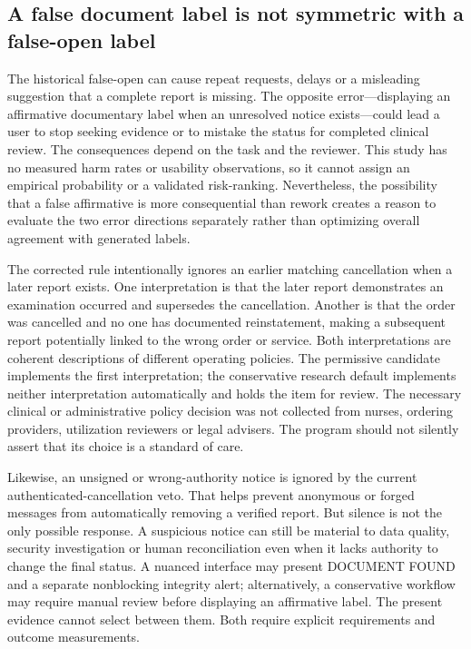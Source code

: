 \documentclass[11pt,twocolumn]{article}
\newcommand{\stage}[1]{\textsf{#1}}
\begin{document}
\subsection{A false document label is not symmetric with a false-open label}
The historical false-open can cause repeat requests, delays or a misleading suggestion that a complete report is missing. The opposite error---displaying an affirmative documentary label when an unresolved notice exists---could lead a user to stop seeking evidence or to mistake the status for completed clinical review. The consequences depend on the task and the reviewer. This study has no measured harm rates or usability observations, so it cannot assign an empirical probability or a validated risk-ranking. Nevertheless, the possibility that a false affirmative is more consequential than rework creates a reason to evaluate the two error directions separately rather than optimizing overall agreement with generated labels.

The corrected rule intentionally ignores an earlier matching cancellation when a later report exists. One interpretation is that the later report demonstrates an examination occurred and supersedes the cancellation. Another is that the order was cancelled and no one has documented reinstatement, making a subsequent report potentially linked to the wrong order or service. Both interpretations are coherent descriptions of different operating policies. The permissive candidate implements the first interpretation; the conservative research default implements neither interpretation automatically and holds the item for review. The necessary clinical or administrative policy decision was not collected from nurses, ordering providers, utilization reviewers or legal advisers. The program should not silently assert that its choice is a standard of care.

Likewise, an unsigned or wrong-authority notice is ignored by the current authenticated-cancellation veto. That helps prevent anonymous or forged messages from automatically removing a verified report. But silence is not the only possible response. A suspicious notice can still be material to data quality, security investigation or human reconciliation even when it lacks authority to change the final status. A nuanced interface may present \stage{DOCUMENT FOUND} and a separate nonblocking integrity alert; alternatively, a conservative workflow may require manual review before displaying an affirmative label. The present evidence cannot select between them. Both require explicit requirements and outcome measurements.
\end{document}
